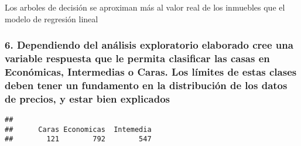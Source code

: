 \documentclass[
]{article}
\newenvironment{Shaded}{\begin{snugshade}}{\end{snugshade}}
\newcommand{\DecValTok}[1]{\textcolor[rgb]{0.00,0.00,0.81}{#1}}
\newcommand{\FunctionTok}[1]{\textcolor[rgb]{0.00,0.00,0.00}{#1}}
\newcommand{\NormalTok}[1]{#1}
\newcommand{\OtherTok}[1]{\textcolor[rgb]{0.56,0.35,0.01}{#1}}
\newcommand{\SpecialCharTok}[1]{\textcolor[rgb]{0.00,0.00,0.00}{#1}}
\newcommand{\StringTok}[1]{\textcolor[rgb]{0.31,0.60,0.02}{#1}}
\begin{document}
Los arboles de decisión se aproximan más al valor real de los inmuebles
que el modelo de regresión lineal

\hypertarget{dependiendo-del-anuxe1lisis-exploratorio-elaborado-cree-una-variable-respuesta-que-le-permita-clasificar-las-casas-en-econuxf3micas-intermedias-o-caras.-los-luxedmites-de-estas-clases-deben-tener-un-fundamento-en-la-distribuciuxf3n-de-los-datos-de-precios-y-estar-bien-explicados}{%
\subsubsection{6. Dependiendo del análisis exploratorio elaborado cree
una variable respuesta que le permita clasificar las casas en
Económicas, Intermedias o Caras. Los límites de estas clases deben tener
un fundamento en la distribución de los datos de precios, y estar bien
explicados}\label{dependiendo-del-anuxe1lisis-exploratorio-elaborado-cree-una-variable-respuesta-que-le-permita-clasificar-las-casas-en-econuxf3micas-intermedias-o-caras.-los-luxedmites-de-estas-clases-deben-tener-un-fundamento-en-la-distribuciuxf3n-de-los-datos-de-precios-y-estar-bien-explicados}}

\begin{Shaded}
\end{Shaded}

\begin{verbatim}
## 
##      Caras Economicas  Intemedia 
##        121        792        547
\end{verbatim}
\end{document}

